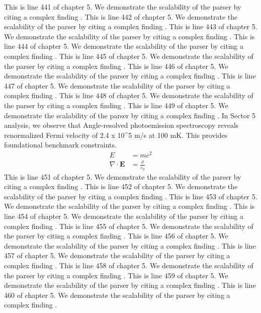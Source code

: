 This is line 441 of chapter 5. We demonstrate the scalability of the parser by citing a complex finding \cite{ref5_441}.
This is line 442 of chapter 5. We demonstrate the scalability of the parser by citing a complex finding \cite{ref5_442}.
This is line 443 of chapter 5. We demonstrate the scalability of the parser by citing a complex finding \cite{ref5_443}.
This is line 444 of chapter 5. We demonstrate the scalability of the parser by citing a complex finding \cite{ref5_444}.
This is line 445 of chapter 5. We demonstrate the scalability of the parser by citing a complex finding \cite{ref5_445}.
This is line 446 of chapter 5. We demonstrate the scalability of the parser by citing a complex finding \cite{ref5_446}.
This is line 447 of chapter 5. We demonstrate the scalability of the parser by citing a complex finding \cite{ref5_447}.
This is line 448 of chapter 5. We demonstrate the scalability of the parser by citing a complex finding \cite{ref5_448}.
This is line 449 of chapter 5. We demonstrate the scalability of the parser by citing a complex finding \cite{ref5_449}.
In Sector 5 analysis, we observe that Angle-resolved photoemission spectroscopy reveals renormalized Fermi velocity of 2.4 x 10^5 m/s at 100 mK. This provides foundational benchmark constraints.
\begin{align*}
  E &= mc^2 \\
  \nabla \cdot \mathbf{E} &= \frac{\rho}{\varepsilon_0}
\end{align*}
This is line 451 of chapter 5. We demonstrate the scalability of the parser by citing a complex finding \cite{ref5_451}.
This is line 452 of chapter 5. We demonstrate the scalability of the parser by citing a complex finding \cite{ref5_452}.
This is line 453 of chapter 5. We demonstrate the scalability of the parser by citing a complex finding \cite{ref5_453}.
This is line 454 of chapter 5. We demonstrate the scalability of the parser by citing a complex finding \cite{ref5_454}.
This is line 455 of chapter 5. We demonstrate the scalability of the parser by citing a complex finding \cite{ref5_455}.
This is line 456 of chapter 5. We demonstrate the scalability of the parser by citing a complex finding \cite{ref5_456}.
This is line 457 of chapter 5. We demonstrate the scalability of the parser by citing a complex finding \cite{ref5_457}.
This is line 458 of chapter 5. We demonstrate the scalability of the parser by citing a complex finding \cite{ref5_458}.
This is line 459 of chapter 5. We demonstrate the scalability of the parser by citing a complex finding \cite{ref5_459}.
This is line 460 of chapter 5. We demonstrate the scalability of the parser by citing a complex finding \cite{ref5_460}.
